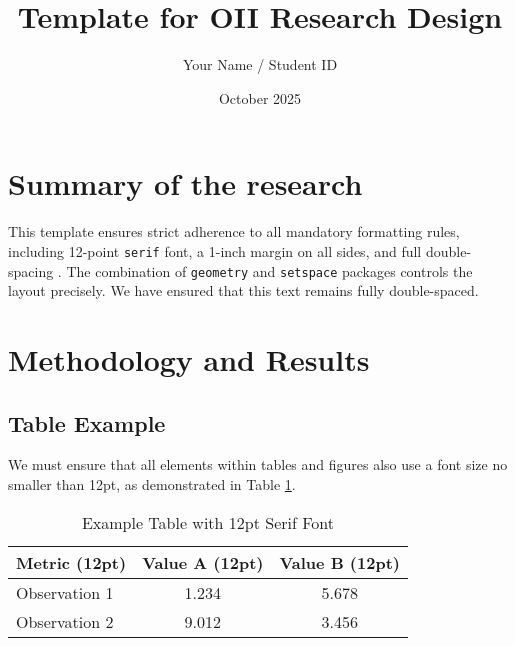 \documentclass[12pt, letterpaper]{article} %
\begin{document}
\title{Template for OII Research Design}
\author{Your Name / Student ID}
\date{October 2025}

\maketitle 


\section{Summary of the research}
This template ensures strict adherence to all mandatory formatting rules, including 12-point \texttt{serif} font, a 1-inch margin on all sides, and full double-spacing \citep{smith2020example}. The combination of \texttt{geometry} and \texttt{setspace} packages controls the layout precisely. We have ensured that this text remains fully double-spaced.

\section{Methodology and Results}

\subsection{Table Example}
We must ensure that all elements within tables and figures also use a font size no smaller than 12pt, as demonstrated in Table \ref{tab:example}.

\begin{table}[h]
    \centering
    \caption{Example Table with 12pt Serif Font}
    \label{tab:example}
    \begin{tabular}{l c c}
        \toprule
        \textbf{Metric (12pt)} & \textbf{Value A (12pt)} & \textbf{Value B (12pt)} \\
        \midrule
        Observation 1 & 1.234 & 5.678 \\
        Observation 2 & 9.012 & 3.456 \\
        \bottomrule
    \end{tabular}
\end{table}
\end{document}
